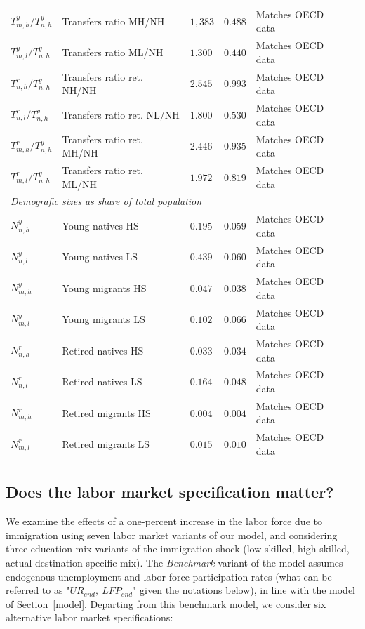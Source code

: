\documentclass[a4paper,12pt]{article}
\begin{document}
\begin{table}[htb!]
\begin{tabular}{llllll}
$T^y_{m,h}/T^y_{n,h}$ & Transfers ratio MH/NH & $1,383$& $0.488$ & Matches OECD data\\
$T^y_{m,l}/T^y_{n,h}$ & Transfers ratio ML/NH& $1.300$ & $0.440$ & Matches OECD data\\
$T^r_{n,h}/T^y_{n,h}$ & Transfers ratio ret. NH/NH& $2.545$ & $0.993$ & Matches OECD data\\
$T^r_{n,l}/T^y_{n,h}$ & Transfers ratio ret. NL/NH& $1.800$ & $0.530$ & Matches OECD data\\
$T^r_{m,h}/T^y_{n,h}$ & Transfers ratio ret. MH/NH& $2.446$& $0.935$ & Matches OECD data\\
$T^r_{m,l}/T^y_{n,h}$ & Transfers ratio ret. ML/NH & $1.972$ & $0.819$ & Matches OECD data\\
\hline
\multicolumn{5}{l}{\textit{Demografic sizes as share of total population}} \\ \hline
$N^y_{n,h}$ & Young natives HS &$0.195$ &$0.059$ & Matches OECD data\\
$N^y_{n,l}$ & Young natives LS &$0.439$ &$0.060$ & Matches OECD data\\
$N^y_{m,h}$ & Young migrants HS & $0.047$&$0.038$ & Matches OECD data\\
$N^y_{m,l}$ & Young migrants LS &$0.102$ &$0.066$ & Matches OECD data\\
$N^r_{n,h}$ & Retired natives HS & $0.033$&$0.034$ & Matches OECD data\\
$N^r_{n,l}$ & Retired natives LS & $0.164$&$0.048$ & Matches OECD data\\
$N^r_{m,h}$ & Retired migrants HS & $0.004$&$0.004$ & Matches OECD data\\
$N^r_{m,l}$ & Retired migrants LS & $0.015$&$0.010$ & Matches OECD data
\\ \hline\hline
\end{tabular}
\end{table}


\subsection{Does the labor market specification matter? \label{sensitivity_to_labor_market}}

We examine the effects of a one-percent increase in the labor force due to immigration using seven labor market variants of our model, and considering three education-mix variants of the immigration shock (low-skilled, high-skilled, actual destination-specific mix). The \textit{Benchmark} variant of the model assumes endogenous unemployment and labor force participation rates (what can be referred to as "$UR_{end},~LFP_{end}$" given the notations below), in line with the model of Section~\ref{model}. Departing from this benchmark model, we consider six alternative labor market specifications:
\end{document}
